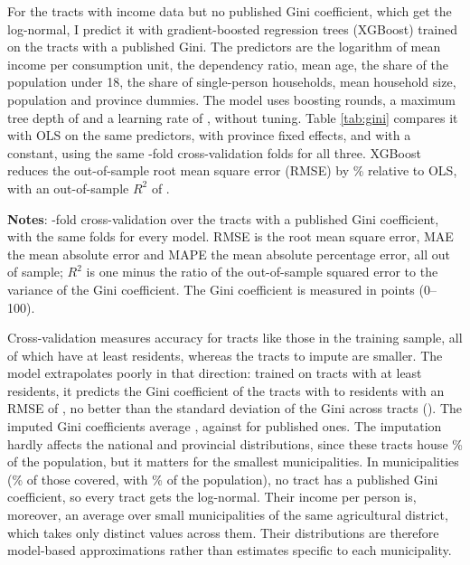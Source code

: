 For the \GiniImputedTracts{} tracts with income data but no published Gini coefficient, which get the log-normal, I predict it with gradient-boosted regression trees (XGBoost) trained on the \GiniTrainTracts{} tracts with a published Gini. The predictors are the logarithm of mean income per consumption unit, the dependency ratio, mean age, the share of the population under 18, the share of single-person households, mean household size, population and province dummies. The model uses \XgbRounds{} boosting rounds, a maximum tree depth of \XgbDepth{} and a learning rate of \XgbEta{}, without tuning. Table \ref{tab:gini} compares it with OLS on the same predictors, with province fixed effects, and with a constant, using the same \CvFolds{}-fold cross-validation folds for all three. XGBoost reduces the out-of-sample root mean square error (RMSE) by \XgbRMSEGain{}\% relative to OLS, with an out-of-sample $R^2$ of \XgbRsq{}.

\begin{table}[H]
\centering
\begin{threeparttable}
\onehalfspacing
\caption{Gini imputation: out-of-sample fit}\label{tab:gini}
\footnotesize

\begin{tablenotes}
\scriptsize
\textbf{Notes}: \CvFolds{}-fold cross-validation over the \GiniTrainTracts{} tracts with a published Gini coefficient, with the same folds for every model. RMSE is the root mean square error, MAE the mean absolute error and MAPE the mean absolute percentage error, all out of sample; $R^2$ is one minus the ratio of the out-of-sample squared error to the variance of the Gini coefficient. The Gini coefficient is measured in points (0--100).
\end{tablenotes}
\end{threeparttable}
\end{table}

Cross-validation measures accuracy for tracts like those in the training sample, all of which have at least \ObsGiniMinPop{} residents, whereas the tracts to impute are smaller. The model extrapolates poorly in that direction: trained on tracts with at least \SmallTrainMin{} residents, it predicts the Gini coefficient of the \SmallTestTracts{} tracts with \ObsGiniMinPop{} to \SmallTestMaxPop{} residents with an RMSE of \XgbSmallRMSE{}, no better than the standard deviation of the Gini across tracts (\GiniSD{}). The imputed Gini coefficients average \GiniPredMean{}, against \GiniObsMean{} for published ones. The imputation hardly affects the national and provincial distributions, since these tracts house \GiniMissPopPct{}\% of the population, but it matters for the smallest municipalities. In \MunSynthetic{} municipalities (\MunSyntheticPct{}\% of those covered, with \MunSyntheticPopPct{}\% of the population), no tract has a published Gini coefficient, so every tract gets the log-normal. Their income per person is, moreover, an average over small municipalities of the same agricultural district, which takes only \MunSyntheticIncomeValues{} distinct values across them. Their distributions are therefore model-based approximations rather than estimates specific to each municipality.

